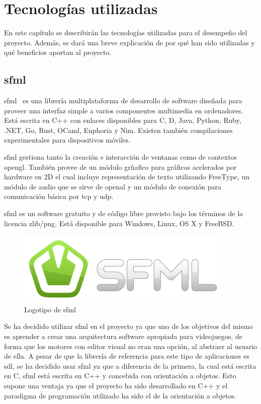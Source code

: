 	\FloatBarrier

\section{Tecnologías utilizadas}

	En este capítulo se describirán las tecnologías utilizadas para el desempeño del proyecto. Además, se dará una breve explicación de por qué han sido utilizadas y qué beneficios aportan al proyecto.

	\subsection{\acrshort{sfml}}

		\acrfull{sfml}~\cite{sfml} es una librería multiplataforma de desarrollo de software diseñada para proveer una interfaz simple a varios componentes multimedia en ordenadores. Está escrita en C++ con enlaces disponibles para C, D, Java, Python, Ruby, .NET, Go, Rust, OCaml, Euphoria y Nim. Existen también compilaciones experimentales para dispositivos móviles.

		\acrshort{sfml} gestiona tanto la creación e interacción de ventanas como de contextos \acrshort{opengl}. También provee de un módulo grñafico para gráficos acelerados por hardware en 2D el cual incluye representación de texto utilizando FreeType, un módulo de audio que se sirve de \acrshort{openal} y un módulo de conexión para comunicación básica por \acrshort{tcp} y \acrshort{udp}.

		\acrshort{sfml} es un software gratuito y de código libre provisto bajo los términos de la licencia zlib/png. Está disponible para Windows, Linux, OS X y FreeBSD.

		\begin{figure}[!htp]
			 \centering
			 \includegraphics[scale=.8]{fig/sfml}
			 \caption{Logotipo de \acrshort{sfml}}
			 \label{fig:sfml}
		\end{figure}

		\FloatBarrier

		Se ha decidido utilizar \acrshort{sfml} en el proyecto ya que uno de los objetivos del mismo es aprender a crear una arquitectura software apropiada para videojuegos, de forma que los motores con editor visual no eran una opción, al abstraer al usuario de ella. A pesar de que la librería de referencia para este tipo de aplicaciones es \acrshort{sdl}, se ha decidido usar \acrshort{sfml} ya que a diferencia de la primera, la cual está escrita en C, \acrshort{sfml} está escrita en C++ y concebida con orientación a objetos. Esto supone una ventaja ya que el proyecto ha sido desarrollado en C++ y el paradigma de programación utilizado ha sido el de la orientación a objetos.


